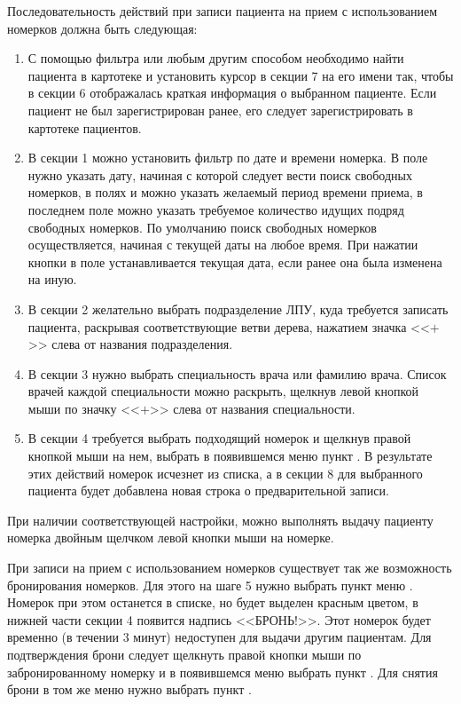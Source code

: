 Последовательность действий при записи пациента на прием с использованием номерков должна быть следующая:
\begin{enumerate}
 \item С помощью фильтра или любым другим способом необходимо найти пациента в картотеке и установить курсор в секции 7 на его имени так, чтобы в секции 6 отображалась краткая информация о выбранном пациенте. Если пациент не был зарегистрирован ранее, его следует зарегистрировать в картотеке пациентов.
 \item В секции 1 можно установить фильтр по дате и времени номерка. В поле  нужно указать дату, начиная с которой следует вести поиск свободных номерков, в полях  и  можно указать желаемый период времени приема, в последнем поле можно указать требуемое количество идущих подряд свободных номерков. По умолчанию поиск свободных номерков осуществляется, начиная с текущей даты на любое время. При нажатии кнопки   в поле  устанавливается текущая дата, если ранее она была изменена на иную.
 \item В секции 2 желательно выбрать подразделение ЛПУ, куда требуется записать пациента, раскрывая соответствующие ветви дерева, нажатием значка <<$+$>> слева от названия подразделения.
 \item В секции 3 нужно выбрать специальность врача или фамилию врача. Список врачей каждой специальности можно раскрыть, щелкнув левой кнопкой мыши по значку <<$+$>> слева от названия специальности.
 \item В секции 4 требуется выбрать подходящий номерок и щелкнув правой кнопкой мыши на нем, выбрать в появившемся меню пункт . В результате этих действий номерок исчезнет из списка, а в секции 8 для выбранного пациента будет добавлена новая строка о предварительной записи.
\end{enumerate}
 
  
\begin{prim}
 При наличии соответствующей настройки, можно выполнять выдачу пациенту номерка двойным щелчком левой кнопки мыши на номерке.
\end{prim}
 
При записи на прием с использованием номерков существует так же возможность бронирования номерков. Для этого на шаге 5 нужно выбрать пункт меню . Номерок при этом останется в списке, но будет выделен красным цветом, в нижней части секции 4 появится надпись <<БРОНЬ!>>. Этот номерок будет временно (в течении 3 минут) недоступен для выдачи другим пациентам. Для подтверждения брони следует щелкнуть правой кнопки мыши по забронированному номерку и в появившемся меню выбрать пункт . Для снятия брони в том же меню нужно выбрать пункт .

